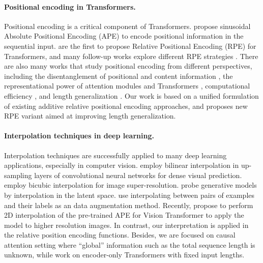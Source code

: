 \paragraph{Positional encoding in Transformers.} Positional encoding is a critical component of Transformers. \citet{vaswani2017attention} propose sinusoidal Absolute Positional Encoding (APE) to encode positional information in the sequential input. \citet{shaw2018self} are the first to propose Relative Positional Encoding (RPE) for Transformers, and many follow-up works explore different RPE strategies
\citep{dai2019transformer,raffel2019exploring}. There are also many works that study positional encoding from different perspectives, including the disentanglement of positional and content information \citep{kitaev2018constituency, ke2021rethinking}, the representational power of attention modules and Transformers \citep{cordonnier2019relationship, chen2021simple, li2021can, luo2022your}, computational efficiency \citep{su2021roformer, liutkus2021relative, luo2021stable, choromanski2023learning}, and length generalization \citep{press2022train,chi2022kerple,chi2023dissecting,kazemnejad2023impact}. Our work is based on a unified formulation of existing additive relative positional encoding approaches, and proposes new RPE variant aimed at improving length generalization.

\paragraph{Interpolation techniques in deep learning.} 

Interpolation techniques are successfully applied to many deep learning applications, especially in computer vision. \citet{long2015fully} employ bilinear interpolation in up-sampling layers of convolutional neural networks for dense visual prediction.
\citet{dong2015image, johnson2016perceptual} employ bicubic interpolation for image super-resolution. 
\citet{radford2015unsupervised} probe generative models by interpolation in the latent space. 
\citet{zhang2018mixup, han2022g} use interpolating between pairs of examples and their labels as an data augmentation method. 
Recently, \citet{dosovitskiy2021an} propose to perform 2D interpolation of the pre-trained APE for Vision Transformer to apply the model to higher resolution images. In contrast, our interpretation is applied in the relative position encoding functions. Besides, we are focused on causal attention setting where ``global'' information such as the total sequence length is unknown, while \citet{dosovitskiy2021an} work on encoder-only Transformers with fixed input lengths.

